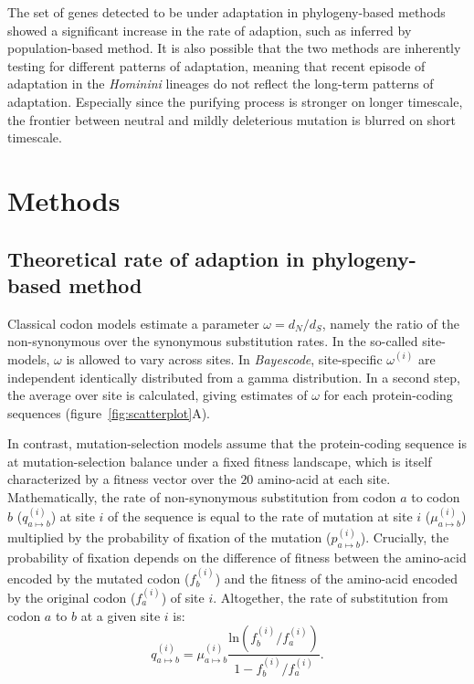 \documentclass{article}
\newcommand{\dn}{d_N}
\newcommand{\ds}{d_S}
\newcommand{\dnds}{\dn / \ds}
\begin{document}
The set of genes detected to be under adaptation in phylogeny-based methods showed a significant increase in the rate of adaption, such as inferred by population-based method.
It is also possible that the two methods are inherently testing for different patterns of adaptation, meaning that recent episode of adaptation in the \textit{Hominini} lineages do not reflect the long-term patterns of adaptation.
Especially since the purifying process is stronger on longer timescale, the frontier between neutral and mildly deleterious mutation is blurred on short timescale\cite{ho_time_2005}.

\section*{Methods}

\subsection*{Theoretical rate of adaption in phylogeny-based method}
Classical codon models estimate a parameter $\omega=\dnds$, namely the ratio of the non-synonymous over the synonymous substitution rates\cite{muse_likelihood_1994,goldman_codon-based_1994}.
In the so-called site-models, $\omega$ is allowed to vary across sites\cite{yang_codon-substitution_2000, huelsenbeck_dirichlet_2006}.
In \textit{Bayescode}, site-specific $\omega^{(i)}$ are independent identically distributed from a gamma distribution\cite{lartillot_phylobayes_2013}.
In a second step, the average over site is calculated, giving estimates of $\omega$ for each protein-coding sequences (figure~\ref{fig:scatterplot}A).

In contrast, mutation-selection models assume that the protein-coding sequence is at mutation-selection balance under a fixed fitness landscape, which is itself characterized by a fitness vector over the $20$ amino-acid at each site\cite{yang_mutation-selection_2008, halpern_evolutionary_1998, rodrigue_mechanistic_2010}.
Mathematically, the rate of non-synonymous substitution from codon $a$ to codon $b$ ($q_{a \mapsto b}^{(i)}$) at site $i$ of the sequence is equal to the rate of mutation at site $i$ ($\mu_{a \mapsto b}^{(i)}$) multiplied by the probability of fixation of the mutation ($p_{a \mapsto b}^{(i)}$).
Crucially, the probability of fixation depends on the difference of fitness between the amino-acid encoded by the mutated codon ($f_b^{(i)}$) and the fitness of the amino-acid encoded by the original codon ($f_a^{(i)}$) of site $i$\cite{wright_evolution_1931, fisher_genetical_1930}.
Altogether, the rate of substitution from codon $a$ to $b$ at a given site $i$ is:
\begin{equation}
	q_{a \mapsto b}^{(i)} = \mu_{a \mapsto b}^{(i)} \dfrac{\mathrm{ln}(f_b^{(i)} / f_a^{(i)})}{1 - f_b^{(i)} / f_a^{(i)}}.
\end{equation}
\end{document}
